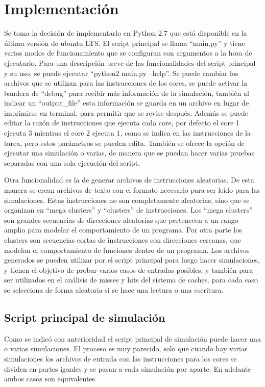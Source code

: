\documentclass {article}
\begin{document}
\section{Implementación}
Se toma la decisión de implementarlo en Python 2.7 que está disponible en la última versión de
ubuntu LTS. El script principal se llama ``main.py'' y tiene varios modos de funcionamiento que se
configuran con argumentos a la hora de ejecutarlo. Para una descripción breve de las funcionalidades
del script principal y su uso, se puede ejecutar ``python2 main.py --help''. Se puede cambiar los
archivos que se utilizan para las instrucciones de los cores, se puede activar la bandera de
``debug'' para recibir más información de la simulación, también al indicar un ``output\_file'' esta
información se guarda en un archivo en lugar de imprimirse en terminal, para permitir que se revise
después. Además se puede editar la razón de instrucciones que ejecuta cada core, por defecto el core
1 ejecuta 3 mientras el core 2 ejecuta 1, como se indica en las instrucciones de la tarea, pero estos parámetros
se pueden edita. También se ofrece la opción de ejecutar una simulación o varias, de manera que se puedan
hacer varias pruebas separadas con una sola ejecución del script.

Otra funcionalidad es la de
generar archivos de instrucciones aleatorias. De esta manera se crean archivos de texto con el
formato necesario para ser leído para las simulaciones. Estas instrucciones no son completamente
aleatorias, sino que se organizan en ``mega clusters'' y ``clusters'' de instrucciones. Los ``mega
clusters'' son grandes secuencias de direcciones aleatorias que pertenecen a un rango amplio para modelar el
comportamiento de un programa. Por otra parte los clusters son secuencias cortas de instrucciones
con direcciones cercanas, que modelan el comportamiento de funciones dentro de un programa. Los
archivos generados se pueden utilizar por el script principal para luego hacer simulaciones, y
tienen el objetivo de probar varios casos de entradas posibles, y también para ser utilizados en el
análisis de misses y hits del sistema de caches. para cada caso se selecciona de forma aleatoria si
se hace una lectura o una escritura. 

\subsection{Script principal de simulación}
Como se indicó con anterioridad el script principal de simulación puede hacer una o varias
simulaciones. El proceso es muy parecido, solo que cuando hay varias simulaciones los archivos de
entrada con las instrucciones para los cores se dividen en partes iguales y se pasan a cada
simulación por aparte. En adelante ambos casos son equivalentes.
\end{document}
